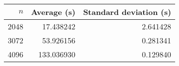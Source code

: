\begin{tabular}{rrr}
$n$ & Average (s) & Standard deviation (s)\\\hline
2048 & 17.438242 & 2.641428\\
3072 & 53.926156 & 0.281341\\
4096 & 133.036930 & 0.129840\\
\end{tabular}
